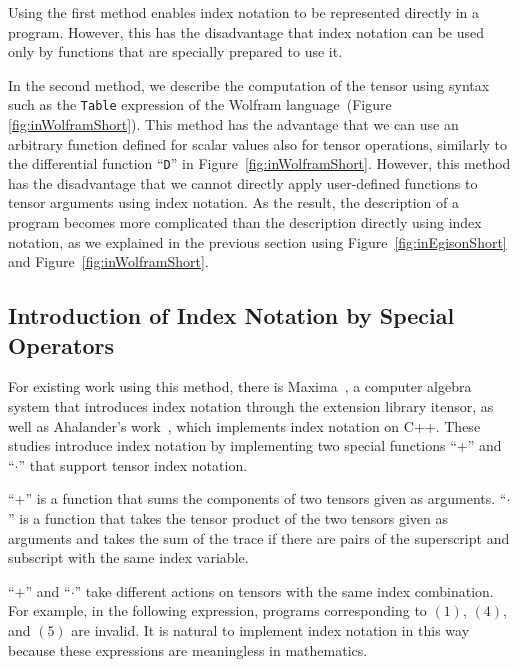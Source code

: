 \documentclass[acmlarge]{acmart}
\begin{document}
Using the first method enables index notation to be represented directly in a program.
However, this has the disadvantage that index notation can be used only by functions that are specially prepared to use it.

In the second method, we describe the computation of the tensor using syntax such as the \texttt{Table} expression of the Wolfram language~(Figure \ref{fig:inWolframShort}).
This method has the advantage that we can use an arbitrary function defined for scalar values also for tensor operations, similarly to the differential function ``\texttt{D}'' in Figure~\ref{fig:inWolframShort}.
However, this method has the disadvantage that we cannot directly apply user-defined functions to tensor arguments using index notation.
As the result, the description of a program becomes more complicated than the description directly using index notation, as we explained in the previous section using Figure~\ref{fig:inEgisonShort} and Figure~\ref{fig:inWolframShort}.


\subsection{Introduction of Index Notation by Special Operators}\label{maxima}

For existing work using this method, there is Maxima~\cite{maximaWeb,toth2005tensor}, a computer algebra system that introduces index notation through the extension library itensor, as well as Ahalander's work~\cite{aahlander2002einstein}, which implements index notation on C++.
These studies introduce index notation by implementing two special functions ``$+$'' and ``$\cdot$'' that support tensor index notation.

``$+$'' is a function that sums the components of two tensors given as arguments.
``$\cdot$'' is a function that takes the tensor product of the two tensors given as arguments and takes the sum of the trace if there are pairs of the superscript and subscript with the same index variable.

``$+$'' and ``$\cdot$'' take different actions on tensors with the same index combination.
For example, in the following expression, programs corresponding to $(1)$, $(4)$, and $(5)$ are invalid.
It is natural to implement index notation in this way because these expressions are meaningless in mathematics.
\end{document}
